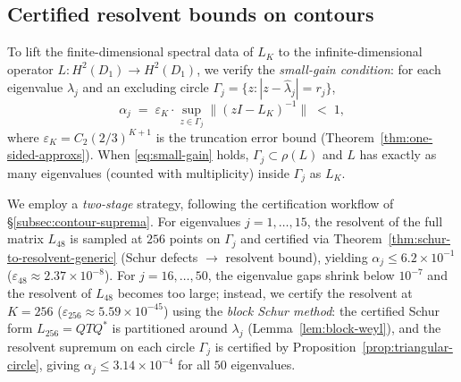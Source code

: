 %
%
%

\subsection{Certified resolvent bounds on contours}
\label{sec:certified-resolvent}

To lift the finite-dimensional spectral data of $L_K$ to the
infinite-dimensional operator $L : H^2(D_1) \to H^2(D_1)$,
we verify the \emph{small-gain condition}: for each eigenvalue
$\lambda_j$ and an excluding circle
$\Gamma_j = \{z : |z - \hat\lambda_j| = r_j\}$,
\begin{equation}
\label{eq:small-gain}
\alpha_j \;=\; \varepsilon_K \cdot
  \sup_{z \in \Gamma_j} \|(z I - L_K)^{-1}\| \;< \;1,
\end{equation}
where $\varepsilon_K = C_2 (2/3)^{K+1}$ is the truncation error bound
(Theorem~\ref{thm:one-sided-approxs}).
When \eqref{eq:small-gain} holds, $\Gamma_j \subset \rho(L)$ and $L$
has exactly as many eigenvalues (counted with multiplicity) inside
$\Gamma_j$ as $L_K$.

We employ a \emph{two-stage} strategy, following the
certification workflow of \S\ref{subsec:contour-suprema}.
For eigenvalues $j = 1, \ldots, 15$, the resolvent of the full matrix
$L_{48}$ is sampled at $256$ points on $\Gamma_j$ and certified
via Theorem~\ref{thm:schur-to-resolvent-generic}
(Schur defects $\to$ resolvent bound),
yielding $\alpha_j \leq 6.2 \times 10^{-1}$
($\varepsilon_{48} \approx 2.37 \times 10^{-8}$).
For $j = 16, \ldots, 50$, the eigenvalue gaps shrink below $10^{-7}$
and the resolvent of $L_{48}$ becomes too large;
instead, we certify the resolvent at $K = 256$
($\varepsilon_{256} \approx 5.59 \times 10^{-45}$)
using the \emph{block Schur method}: the certified Schur form
$L_{256} = Q T Q^*$ is partitioned around $\lambda_j$
(Lemma~\ref{lem:block-weyl}), and the
resolvent supremum on each circle $\Gamma_j$ is certified by
Proposition~\ref{prop:triangular-circle},
giving $\alpha_j \leq 3.14 \times 10^{-4}$
for all $50$ eigenvalues.

